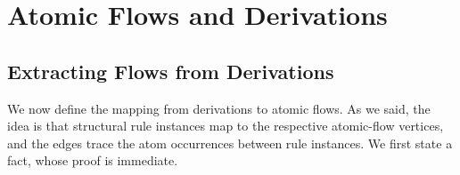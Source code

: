 \chapter{Atomic Flows and Derivations}\label{chapter:FlowsAndDerivations}

\section{Extracting Flows from Derivations}\label{section:ExtractingFlowsFromDerivations}

We now define the mapping from derivations to atomic flows. As we said, the idea is that structural rule instances map to the respective atomic-flow vertices, and the edges trace the atom occurrences between rule instances. We first state a fact, whose proof is immediate.

